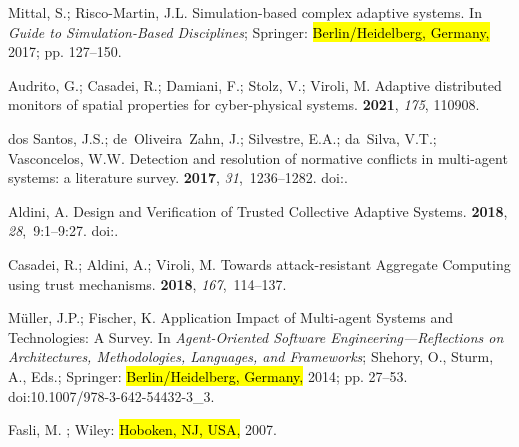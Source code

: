 \documentclass[jsan,article,accept,moreauthors,pdftex]{Definitions/mdpi}
\begin{document}
\begin{thebibliography}{999}
Mittal, S.; Risco-Martin, J.L.
\newblock Simulation-based complex adaptive systems. In {\em Guide to
  Simulation-Based Disciplines}; Springer:  \hl{Berlin/Heidelberg, Germany,} %
  2017; pp. 127--150.

Audrito, G.; Casadei, R.; Damiani, F.; Stolz, V.; Viroli, M.
\newblock Adaptive distributed monitors of spatial properties for
  cyber-physical systems.
 {\bf 2021}, \emph{175}, 110908.

dos Santos, J.S.; de~Oliveira~Zahn, J.; Silvestre, E.A.; da~Silva, V.T.;
  Vasconcelos, W.W.
\newblock Detection and resolution of normative conflicts in multi-agent
  systems: a literature survey.
 {\bf 2017}, {\em
  31},~1236--1282.
\newblock
  doi:{\href{https://doi.org/10.1007/s10458-017-9362-z}{}}.

Aldini, A.
\newblock Design and Verification of Trusted Collective Adaptive Systems.
 {\bf 2018}, {\em
  28},~9:1--9:27.
\newblock
  doi:{\href{https://doi.org/10.1145/3155337}{}}.

Casadei, R.; Aldini, A.; Viroli, M.
\newblock Towards attack-resistant Aggregate Computing using trust mechanisms.
 {\bf 2018}, {\em 167},~114--137.

M{\"{u}}ller, J.P.; Fischer, K.
\newblock Application Impact of Multi-agent Systems and Technologies: {A}
  Survey. In {\em Agent-Oriented Software Engineering---Reflections on
  Architectures, Methodologies, Languages, and Frameworks}; Shehory, O., Sturm,
  A., Eds.; Springer: \hl{Berlin/Heidelberg, Germany,} 2014; pp. 27--53.
\newblock
  doi:10.1007/978-3-642-54432-3\_3.

Fasli, M.
; Wiley:  \hl{Hoboken, NJ, USA,} %
  2007.


\end{thebibliography}
\end{document}
